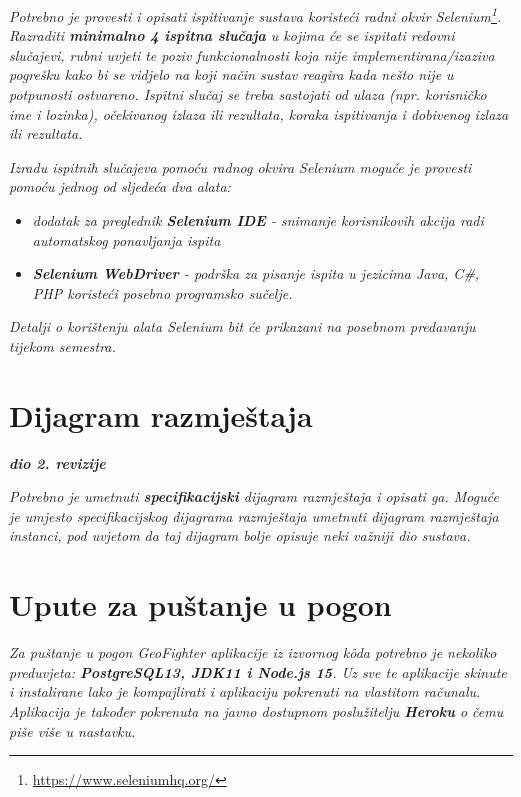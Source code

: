 			 \textit{Potrebno je provesti i opisati ispitivanje sustava koristeći radni okvir Selenium\footnote{\url{https://www.seleniumhq.org/}}. Razraditi \textbf{minimalno 4 ispitna slučaja} u kojima će se ispitati redovni slučajevi, rubni uvjeti te poziv funkcionalnosti koja nije implementirana/izaziva pogrešku kako bi se vidjelo na koji način sustav reagira kada nešto nije u potpunosti ostvareno. Ispitni slučaj se treba sastojati od ulaza (npr. korisničko ime i lozinka), očekivanog izlaza ili rezultata, koraka ispitivanja i dobivenog izlaza ili rezultata.\\ }
			 
			 \textit{Izradu ispitnih slučajeva pomoću radnog okvira Selenium moguće je provesti pomoću jednog od sljedeća dva alata:}
			 \begin{itemize}
			 	\item \textit{dodatak za preglednik \textbf{Selenium IDE} - snimanje korisnikovih akcija radi automatskog ponavljanja ispita	}
			 	\item \textit{\textbf{Selenium WebDriver} - podrška za pisanje ispita u jezicima Java, C\#, PHP koristeći posebno programsko sučelje.}
			 \end{itemize}
		 	\textit{Detalji o korištenju alata Selenium bit će prikazani na posebnom predavanju tijekom semestra.}
			
			\eject 
		
		
		\section{Dijagram razmještaja}
			
			\textbf{\textit{dio 2. revizije}}
			
			 \textit{Potrebno je umetnuti \textbf{specifikacijski} dijagram razmještaja i opisati ga. Moguće je umjesto specifikacijskog dijagrama razmještaja umetnuti dijagram razmještaja instanci, pod uvjetom da taj dijagram bolje opisuje neki važniji dio sustava.}
			
			\eject 
		
		\section{Upute za puštanje u pogon}
		
			\textit{Za puštanje u pogon GeoFighter aplikacije iz izvornog kôda potrebno je nekoliko preduvjeta: \textbf{PostgreSQL13, JDK11 i Node.js 15}. Uz sve te aplikacije skinute i instalirane lako je kompajlirati i aplikaciju pokrenuti na vlastitom računalu. Aplikacija je također pokrenuta na javno dostupnom poslužitelju \textbf{Heroku} o čemu piše više u nastavku.\\}
			
